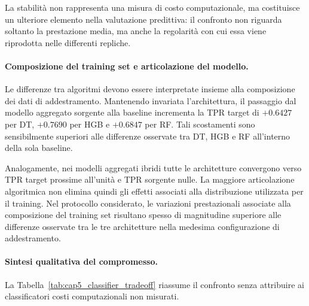 La stabilità non rappresenta una misura di costo computazionale, ma costituisce un ulteriore elemento nella valutazione predittiva: il confronto non riguarda soltanto la prestazione media, ma anche la regolarità con cui essa viene riprodotta nelle differenti repliche.

\paragraph{Composizione del training set e articolazione del modello.}
Le differenze tra algoritmi devono essere interpretate insieme alla composizione dei dati di addestramento. 
Mantenendo invariata l'architettura, il passaggio dal modello aggregato sorgente alla baseline incrementa la TPR target di $+0.6427$ per DT, $+0.7690$ per HGB e $+0.6847$ per RF. 
Tali scostamenti sono sensibilmente superiori alle differenze osservate tra DT, HGB e RF all'interno della sola baseline.

Analogamente, nei modelli aggregati ibridi tutte le architetture convergono verso TPR target prossime all'unità e TPR sorgente nulle. 
La maggiore articolazione algoritmica non elimina quindi gli effetti associati alla distribuzione utilizzata per il training. 
Nel protocollo considerato, le variazioni prestazionali associate alla composizione del training set risultano spesso di magnitudine superiore alle differenze osservate tra le tre architetture nella medesima configurazione di addestramento.

\paragraph{Sintesi qualitativa del compromesso.}
La Tabella~\ref{tab:cap5_classifier_tradeoff} riassume il confronto senza attribuire ai classificatori costi computazionali non misurati.

